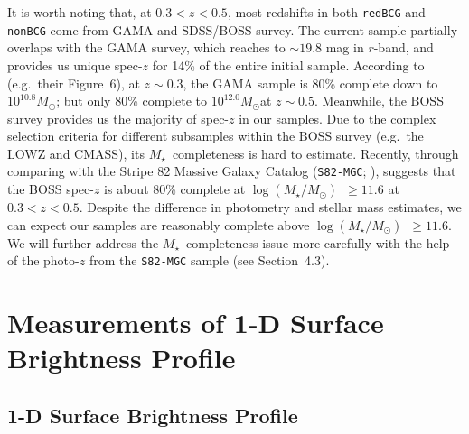 \documentclass[preprint]{aastex}
\def\msun{$M_\odot$}
\def\logms{{$\log (M_{\star}/M_{\odot})$}~}
\def\mstar{{$M_{\star}$}~}
\begin{document}
\begin{CJK*}{UTF8}{gbsn}
    It is worth noting that, at $0.3 < z < 0.5$, most redshifts in both \texttt{redBCG} 
    and \texttt{nonBCG} come from GAMA and SDSS/BOSS survey.  
    The current sample partially overlaps with the GAMA survey, which reaches 
    to $\sim 19.8$ mag in $r$-band, and provides us unique spec-$z$ for 14\% of the 
    entire initial sample. 
    According to \citet{Taylor2011} (e.g.\ their Figure~6), at $z\sim 0.3$, the GAMA 
    sample is 80\% complete down to $10^{10.8}$\msun; but only 80\% complete to 
    $10^{12.0}$\msun at $z\sim 0.5$. 
    Meanwhile, the BOSS survey provides us the majority of spec-$z$ in our samples.  
    Due to the complex selection criteria for different subsamples within the BOSS
    survey (e.g.\ the LOWZ and CMASS), its \mstar completeness is hard to estimate.  
    Recently, through comparing with the Stripe 82 Massive Galaxy Catalog
    (\texttt{S82-MGC}; \citealt{Bundy2015}), \citet{Leauthaud2016} suggests that the 
    BOSS spec-$z$ is about 80\% complete at \logms$\geq 11.6$ at $0.3 < z < 0.5$. 
    Despite the difference in photometry and stellar mass estimates, we can expect 
    our samples are reasonably complete above \logms$\geq 11.6$.
    We will further address the \mstar completeness issue more carefully with the 
    help of the photo-$z$ from the \texttt{S82-MGC} sample (see Section~4.3). 


\section{Measurements of 1-D Surface Brightness Profile}

\subsection{1-D Surface Brightness Profile}
    

\end{CJK*}
\end{document}
